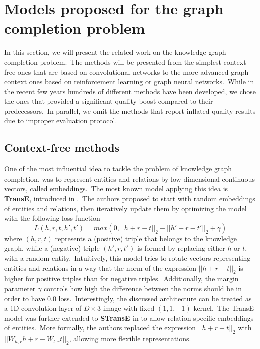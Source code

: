 \documentclass[longabstract, english, mgr]{iithesis}
\theoremstyle{default_theorem_style}\newtheorem{theorem}{Theorem}
\theoremstyle{default_theorem_style}\newtheorem{definition}{Definition}
\begin{document}
\section{Models proposed for the graph completion problem}\label{sec:background_models}

In this section, we will present the related work on the knowledge graph completion problem.\ The methods will be
presented from the simplest context-free ones that are based on convolutional networks to the more advanced
graph-context ones based on reinforcement learning or graph neural networks.\ While in the recent few years hundreds of
different methods have been developed, we chose the ones that provided a significant quality boost compared to their
predecessors.\ In parallel, we omit the methods that report inflated quality results due to improper evaluation
protocol.

\subsection{Context-free methods}

One of the most influential idea to tackle the problem of knowledge graph completion, was to represent entities and
relations by low-dimensional continuous vectors, called embeddings.\ The most known model applying this idea is
\textbf{TransE}, introduced in \cite{transe_model}.\ The authors proposed to
start with random embeddings of entities and relations, then iteratively update them by optimizing the model
with the following loss function
$$
L(h, r, t, h', t') = max(0, ||h + r - t||_2 - ||h' + r - t'||_2 + \gamma)
$$
where $(h, r, t)$ represents a (positive) triple that belongs to the knowledge graph, while a (negative) triple
$(h', r, t')$ is formed by replacing either $h$ or $t$, with a random entity.\ Intuitively, this model tries to
rotate vectors representing entities and relations in a way that the norm of the expression $||h + r - t||_2$ is higher
for positive triples than for negative triples.\ Additionally, the margin parameter $\gamma$ controls how high the
difference between the norms should be in order to have $0.0$ loss.\ Interestingly, the discussed architecture can be
treated as a 1D convolution layer of $D \times 3$ image with fixed $(1, 1, -1)$ kernel.\ The TransE model was
further extended to \textbf{STransE} in \cite{stranse_model} to allow relation-specific embeddings of entities.\ More
formally, the authors replaced the expression $||h + r - t||_2$ with $||W_{h,r} h + r - W_{t,r} t||_2$, allowing more
flexible representations.\newline
\end{document}
